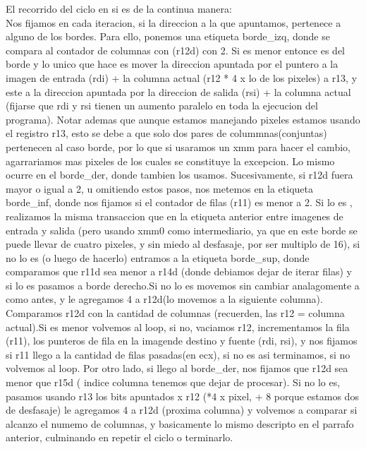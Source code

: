 \documentclass[a4paper]{article}
\begin{document}
	El recorrido del ciclo en si es de la continua manera:
	\hfill \break
	\\
	Nos fijamos en cada iteracion, si la direccion a la que apuntamos, pertenece a alguno de los bordes. Para ello, ponemos una etiqueta borde_izq, donde se compara al contador de columnas con (r12d) con 2. Si es menor  entonce es del borde y lo unico que hace es mover la direccion apuntada por el puntero a la imagen de entrada (rdi) + la columna actual (r12 * 4 x lo de los pixeles) a r13, y este a la direccion apuntada por la direccion de salida (rsi) + la columna actual  (fijarse  que rdi y rsi tienen un aumento paralelo en toda la ejecucion del programa). \hfill \break
Notar ademas que aunque estamos manejando pixeles estamos usando el registro r13, esto se debe a que solo dos pares de colummnas(conjuntas) pertenecen al caso borde, por lo que si usaramos un xmm para hacer el cambio, agarrariamos mas pixeles de los cuales se constituye la excepcion. Lo mismo ocurre en el borde_der, donde tambien los usamos.\hfill \break
	Sucesivamente, si  r12d fuera mayor o igual a 2, u omitiendo estos pasos, nos metemos en la etiqueta borde_inf, donde nos fijamos si el contador de filas (r11) es menor a 2. Si lo es , realizamos la misma transaccion que en la etiqueta anterior entre imagenes de entrada y salida (pero usando xmm0 como intermediario, ya que en este borde se puede llevar de cuatro pixeles, y sin miedo al desfasaje, por ser multiplo de 16), si no lo es (o luego de hacerlo) entramos a la etiqueta borde_sup, donde comparamos que r11d sea menor a r14d (donde debiamos dejar de iterar filas)  y   si lo es pasamos a borde derecho.Si no lo es  movemos sin cambiar analagomente a como antes, y le agregamos  4 a r12d(lo movemos a la siguiente columna).\hfill \break
	Comparamos r12d con la cantidad de columnas (recuerden, las r12 = columna actual).Si es menor volvemos al loop, si no, vaciamos r12, incrementamos la fila (r11), los punteros de fila en la imagende destino y fuente (rdi, rsi), y nos fijamos si r11 llego a la cantidad de filas pasadas(en ecx), si no es asi terminamos, si no volvemos al loop. \hfill \break
	Por otro lado, si llego al borde_der, nos fijamos que r12d sea menor que r15d ( indice columna tenemos que dejar de procesar). Si no lo es, pasamos usando r13 los bits apuntados x r12 (*4 x pixel, + 8 porque estamos dos de desfasaje)  le agregamos 4 a r12d (proxima columna) y volvemos a comparar si alcanzo el numemo de columnas, y basicamente lo mismo descripto en el parrafo anterior, culminando en repetir el ciclo o terminarlo. \hfill \break
\end{document}
